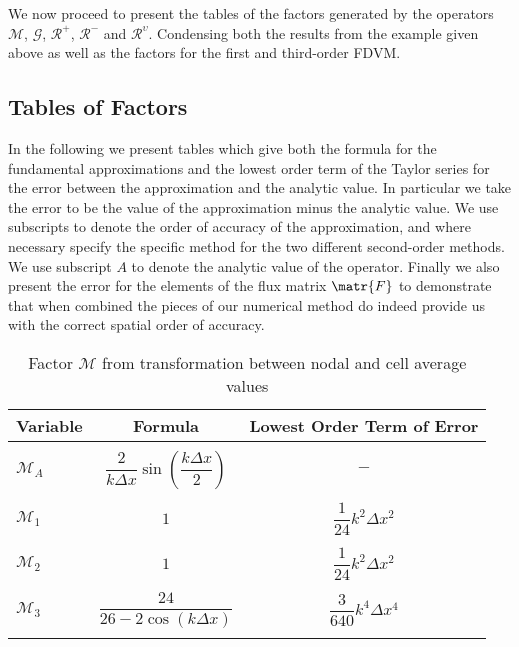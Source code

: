We now proceed to present the tables of the factors generated by the operators $\mathcal{M}$, $\mathcal{G}$, $\mathcal{R}^+$, $\mathcal{R}^-$ and $\mathcal{R}^{\upsilon}$. Condensing both the results from the example given above as well as the factors for the first and third-order FDVM. 

\subsection{Tables of Factors}
\label{subsec:TabFacdisp}
In the following we present tables which give both the formula for the fundamental approximations and the lowest order term of the Taylor series for the error between the approximation and the analytic value. In particular we take the error to be the value of the approximation minus the analytic value. We use subscripts to denote the order of accuracy of the approximation, and where necessary specify the specific method for the two different second-order methods. We use subscript $A$ to denote the analytic value of the operator. Finally we also present the error for the elements of the flux matrix $\matr{F}$ to demonstrate that when combined the pieces of our numerical method do indeed provide us with the correct spatial order of accuracy.
\begin{table}
	\centering
	\begin{tabular}{l  c  c}
		Variable& Formula& Lowest Order Term of Error \\
		\hline && \\
		$\mathcal{M}_A$& $\dfrac{2}{k \Delta x } \sin\left(\dfrac{k\Delta x}{2}\right)$ & $-$ \\ & & \\
		$\mathcal{M}_1$& $1$ & $\dfrac{1}{24}k^2 \Delta x^2$ \\ & & \\
		$\mathcal{M}_2$& $1$ & $\dfrac{1}{24}k^2 \Delta x^2$ \\ & & \\
		$\mathcal{M}_3$& $\dfrac{24}{26 - 2 \cos\left(k \Delta x\right)}$ & $\dfrac{3}{640}k^4 \Delta x^4$ \\ & & \\
	\end{tabular}
	\caption{Factor $\mathcal{M}$ from transformation between nodal and cell average values}
	\label{tab:Mfactor}
\end{table}


